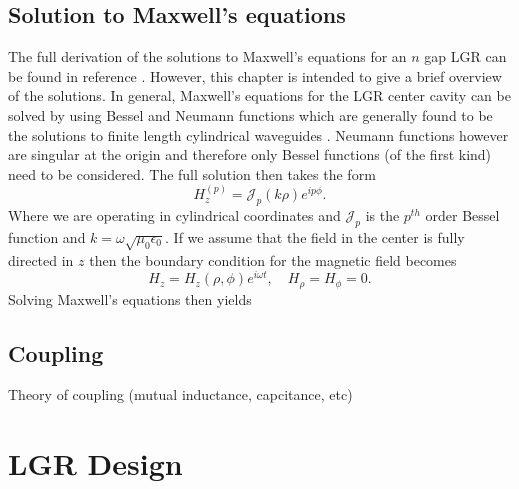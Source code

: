 \subsection{Solution to Maxwell's equations} \label{fields}

The full derivation of the solutions to Maxwell's equations for an $n$ gap LGR can be found in reference \cite{piasecki1993field}. However, this chapter is intended to give a brief overview of the solutions. In general, Maxwell's equations for the LGR center cavity can be solved by using Bessel and Neumann functions which are generally found to be the solutions to finite length cylindrical waveguides \cite{}. Neumann functions however are singular at the origin and therefore only Bessel functions (of the first kind) need to be considered. The full solution then takes the form
\begin{equation}
H_z^{(p)} = \mathcal{J}_p(k\rho) e^{i p \phi}.
\end{equation}
Where we are operating in cylindrical coordinates and $\mathcal{J}_p$ is the $p^{th}$ order Bessel function and $k = \omega \sqrt{\mu_0\epsilon_0}$. If we assume that the field in the center is fully directed in $z$ then the boundary condition for the magnetic field becomes
\begin{equation}
H_z = H_z(\rho,\phi)e^{i\omega t}, \quad H_{\rho} = H_{\phi} = 0.  
\end{equation} 
Solving Maxwell's equations then yields



\subsection{Coupling} \label{coupling}

Theory of coupling (mutual inductance, capcitance, etc)

\section{LGR Design} \label{LGRDesignSection}

